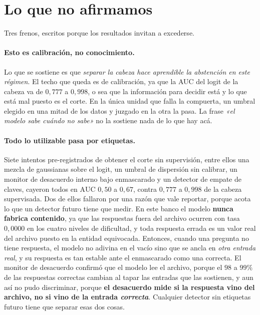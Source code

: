 \documentclass[11pt,a4paper]{article}
\begin{document}
\section{Lo que no afirmamos}
\label{sec:noafirma}

Tres frenos, escritos porque los resultados invitan a excederse.

\paragraph{Esto es calibración, no conocimiento.} Lo que se sostiene es que \emph{separar la cabeza
hace aprendible la abstención en este régimen}. El techo que queda es de calibración, ya que la AUC
del logit de la cabeza va de $0{,}777$ a $0{,}998$, o sea que la información para decidir está y lo
que está mal puesto es el corte. En la única unidad que falla la compuerta, un umbral elegido en una
mitad de los datos y juzgado en la otra la pasa. La frase \emph{«el modelo sabe cuándo no sabe»} no
la sostiene nada de lo que hay acá.

\paragraph{Todo lo utilizable pasa por etiquetas.} Siete intentos pre-registrados de obtener el corte
sin supervisión, entre ellos una mezcla de gaussianas sobre el logit, un umbral de dispersión sin
calibrar, un monitor de desacuerdo interno bajo enmascarado y un detector de empate de claves,
cayeron todos en $\mathrm{AUC}$ $0{,}50$ a $0{,}67$, contra $0{,}777$ a $0{,}998$ de la cabeza
supervisada. Dos de ellos fallaron por una razón que vale reportar, porque acota lo que un detector
futuro tiene que medir. En este banco el modelo \textbf{nunca fabrica contenido}, ya que las
respuestas fuera del archivo ocurren con tasa $0{,}0000$ en los cuatro niveles de dificultad, y toda
respuesta errada es un valor real del archivo puesto en la entidad equivocada. Entonces, cuando una
pregunta no tiene respuesta, el modelo no adivina en el vacío sino que se ancla en \emph{otra entrada
real}, y su respuesta es tan estable ante el enmascarado como una correcta. El monitor de desacuerdo
confirmó que el modelo lee el archivo, porque el $98$ a $99\%$ de las respuestas correctas cambian al
tapar las entradas que las sostienen, y aun así no pudo discriminar, porque \textbf{el desacuerdo
mide si la respuesta vino del archivo, no si vino de la entrada \emph{correcta}}. Cualquier detector
sin etiquetas futuro tiene que separar esas dos cosas.
\end{document}
